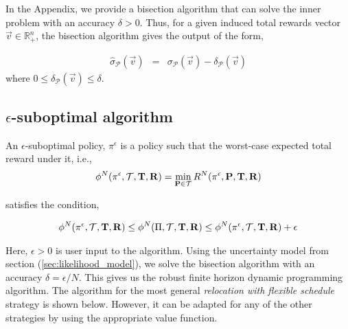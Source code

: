 
In the Appendix, we provide a bisection algorithm that can solve the inner problem with an accuracy $\delta > 0$. Thus, for a given induced total rewards vector $\vec{v} \in \mathbb{R}^n_+$, the bisection algorithm gives the output of the form,

\begin{eqnarray}
\hat{\sigma}_{\mathcal{P}} (\vec{v}) &=& \sigma_{\mathcal{P}} (\vec{v}) - \delta_{\mathcal{P}}(\vec{v})
\end{eqnarray} 
where $0 \leq \delta_{\mathcal{P}}(\vec{v}) \leq \delta$.

\subsection{\texorpdfstring{$\epsilon$}{epsilon}-suboptimal algorithm}

An $\epsilon$-suboptimal policy, $\pi^\epsilon$ is a policy such that the worst-case expected total reward under it, i.e., 
\begin{eqnarray*}
\phi^N(\pi^\epsilon, \mathcal{T}, \mathbf{T}, \mathbf{R}) = \min_{\mathbf{P} \in \mathcal{T}} R^N(\pi^\epsilon, \mathbf{P}, \mathbf{T}, \mathbf{R})
\end{eqnarray*}

satisfies the condition,

\begin{eqnarray}
\phi^N(\pi^\epsilon, \mathcal{T}, \mathbf{T}, \mathbf{R}) \leq \phi^N(\Pi, \mathcal{T}, \mathbf{T}, \mathbf{R}) \leq \phi^N(\pi^\epsilon, \mathcal{T}, \mathbf{T}, \mathbf{R}) + \epsilon
\end{eqnarray}

Here, $\epsilon > 0$ is user input to the algorithm. Using the uncertainty model from section (\ref{sec:likelihood_model}), we solve the bisection algorithm with an accuracy $\delta = \epsilon / N$. This gives us the robust finite horizon dynamic programming algorithm. The algorithm for the most general \textit{relocation with flexible schedule} strategy is shown below. However, it can be adapted for any of the other strategies by using the appropriate value function.

